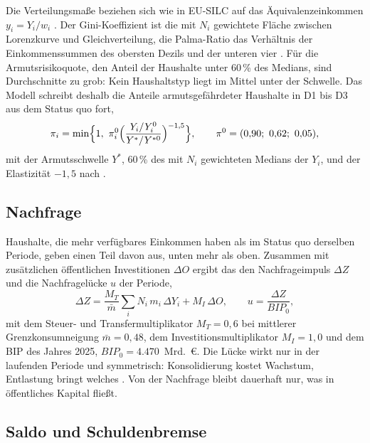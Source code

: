 Die Verteilungsmaße beziehen sich wie in EU-SILC auf das Äquivalenzeinkommen
$y_i = Y_i/w_i$ \parencite{oecd2013}. Der Gini-Koeffizient ist die mit $N_i$
gewichtete Fläche zwischen Lorenzkurve und Gleichverteilung, die
Palma-Ratio das Verhältnis der Einkommenssummen des obersten Dezils und der
unteren vier \parencite{palma2011}. Für die Armutsrisikoquote, den Anteil der
Haushalte unter 60\,\% des Medians, sind Durchschnitte zu grob: Kein
Haushaltstyp liegt im Mittel unter der Schwelle. Das Modell schreibt deshalb
die Anteile armutsgefährdeter Haushalte in D1 bis D3 aus dem Status quo fort,
\begin{equation}
  \pi_i = \min\Bigl\{1,\ \pi_i^0\Bigl(\frac{Y_i/Y_i^0}{Y^{*}/Y^{*0}}\Bigr)^{-1{,}5}\Bigr\},
  \qquad \pi^0 = (0{,}90;\ 0{,}62;\ 0{,}05),
\end{equation}
mit der Armutsschwelle $Y^{*}$, 60\,\% des mit $N_i$ gewichteten Medians der
$Y_i$, und der Elastizität $-1{,}5$ nach \textcite{bourguignon2003}.

\subsection{Nachfrage}
\label{sec:nachfrage}

Haushalte, die mehr verfügbares Einkommen haben als im Status quo derselben
Periode, geben einen Teil davon aus, unten mehr als oben. Zusammen mit
zusätzlichen öffentlichen Investitionen $\Delta O$ ergibt das den
Nachfrageimpuls $\Delta Z$ und die Nachfragelücke $u$ der Periode,
\begin{equation}
  \Delta Z = \frac{M_T}{\bar m}\sum_i N_i\,m_i\,\Delta Y_i + M_I\,\Delta O,
  \qquad u = \frac{\Delta Z}{\mathit{BIP}_0},
\end{equation}
mit dem Steuer- und Transfermultiplikator $M_T = 0{,}6$ bei mittlerer
Grenzkonsumneigung $\bar m = 0{,}48$, dem Investitionsmultiplikator
$M_I = 1{,}0$ \parencite{gechert2015} und dem BIP des Jahres 2025,
$\mathit{BIP}_0 = 4.470$~Mrd.~\euro. Die Lücke wirkt nur in der laufenden
Periode und symmetrisch: Konsolidierung kostet Wachstum, Entlastung bringt
welches \parencite{blanchard2013}. Von der Nachfrage bleibt dauerhaft nur,
was in öffentliches Kapital fließt.

\subsection{Saldo und Schuldenbremse}
\label{sec:saldo}

